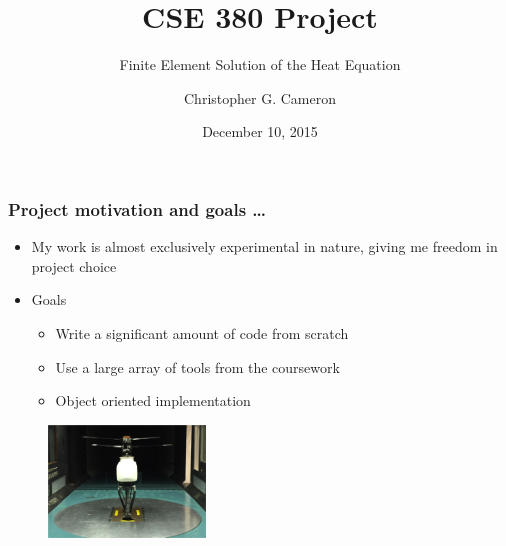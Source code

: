 \documentclass[unknownkeysallowed,12pt,mathserif]{beamer}
\date{December 10, 2015}
\author[C. G. Cameron]{Christopher G. Cameron}
\institute{The University of Texas at Austin}
\title[CSE 380 Project]{CSE 380 Project}
\subtitle{Finite Element Solution of the Heat Equation}
\begin{document}
\begin{frame}
\begin{center}
\end{center}
\titlepage
\begin{flushright}
\end{flushright}
\end{frame}

\begin{frame}
\frametitle{Project motivation and goals \ldots}

\begin{itemize}
\item My work is almost exclusively experimental in nature, giving me freedom in project choice
\item Goals
\begin{itemize}
\item Write a significant amount of code from scratch
\item Use a large array of tools from the coursework
\item Object oriented implementation
\end{itemize}
\end{itemize}

\begin{figure}[!htbp] 
\includegraphics[height = 3cm]{rotor_test_stand.png}
\end{figure}

\end{frame}
\end{document}
